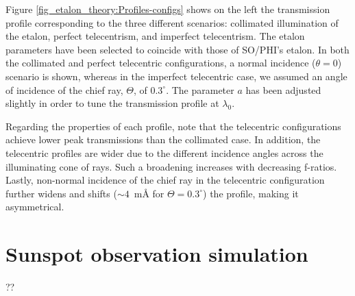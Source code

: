 Figure \ref{fig_etalon_theory:Profiles-configs} shows on the left the transmission profile corresponding to the three different scenarios: collimated illumination of the etalon, perfect telecentrism, and imperfect telecentrism. The etalon parameters have been selected to coincide with those of SO/PHI's etalon. In both the collimated and perfect telecentric configurations, a normal incidence  ($\theta = 0$) scenario is shown, whereas in the imperfect telecentric case, we assumed an angle of incidence of the chief ray, $\Theta$, of $0.3^{\circ}$. The parameter $a$ has been adjusted slightly in order to tune the transmission profile at $\lambda _ 0$. 

Regarding the properties of each profile, note that the telecentric configurations achieve lower peak transmissions than the collimated case. In addition, the telecentric profiles are wider due to the different incidence angles across the illuminating cone of rays. Such a broadening increases with decreasing f-ratios. Lastly, non-normal incidence of the chief ray in the telecentric configuration further widens and shifts ($\sim 4$~m\r{A}
for $\Theta=0.3^\circ$) the profile, making it asymmetrical. 

\section{Sunspot observation simulation}

??

